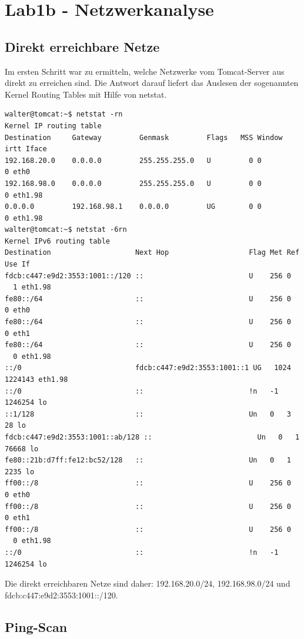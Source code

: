 \section{Lab1b - Netzwerkanalyse}

\subsection{Direkt erreichbare Netze}

Im ersten Schritt war zu ermitteln, welche Netzwerke vom Tomcat-Server aus direkt zu erreichen sind. Die Antwort darauf liefert das Auslesen der sogenannten Kernel Routing Tables mit Hilfe von netstat.

\begin{lstlisting}
walter@tomcat:~$ netstat -rn
Kernel IP routing table
Destination     Gateway         Genmask         Flags   MSS Window  irtt Iface
192.168.20.0    0.0.0.0         255.255.255.0   U         0 0          0 eth0
192.168.98.0    0.0.0.0         255.255.255.0   U         0 0          0 eth1.98
0.0.0.0         192.168.98.1    0.0.0.0         UG        0 0          0 eth1.98
walter@tomcat:~$ netstat -6rn
Kernel IPv6 routing table
Destination                    Next Hop                   Flag Met Ref Use If
fdcb:c447:e9d2:3553:1001::/120 ::                         U    256 0
  1 eth1.98
fe80::/64                      ::                         U    256 0     0 eth0
fe80::/64                      ::                         U    256 0     0 eth1
fe80::/64                      ::                         U    256 0
  0 eth1.98
::/0                           fdcb:c447:e9d2:3553:1001::1 UG   1024
1224143 eth1.98
::/0                           ::                         !n   -1  1246254 lo
::1/128                        ::                         Un   0   3    28 lo
fdcb:c447:e9d2:3553:1001::ab/128 ::                         Un   0   1 76668 lo
fe80::21b:d7ff:fe12:bc52/128   ::                         Un   0   1  2235 lo
ff00::/8                       ::                         U    256 0     0 eth0
ff00::/8                       ::                         U    256 0     0 eth1
ff00::/8                       ::                         U    256 0
  0 eth1.98
::/0                           ::                         !n   -1  1246254 lo
\end{lstlisting}

Die direkt erreichbaren Netze sind daher: 192.168.20.0/24, 192.168.98.0/24 und fdcb:c447:e9d2:3553:1001::/120.

\subsection{Ping-Scan}


